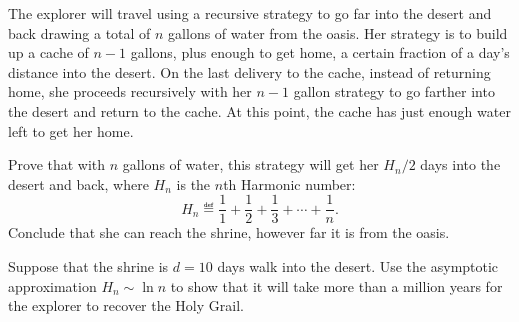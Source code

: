 \begin{problem}
\ppart The explorer will travel using a recursive strategy to go far into
the desert and back drawing a total of $n$ gallons of water from the
oasis.  Her strategy is to build up a cache of $n-1$ gallons, plus enough
to get home, a certain fraction of a day's distance into the desert.  On
the last delivery to the cache, instead of returning home, she proceeds
recursively with her $n-1$ gallon strategy to go farther into the desert
and return to the cache.  At this point, the cache has just enough water
left to get her home.

Prove that with $n$ gallons of water, this strategy will get her $H_n / 2$
days into the desert and back, where $H_n$ is the $n$th Harmonic number:
\[
H_n \eqdef \frac{1}{1} + \frac{1}{2} + \frac{1}{3} + \cdots + \frac{1}{n}.
\]
Conclude that she can reach the shrine, however far it is from the oasis.


\ppart Suppose that the shrine is $d = 10$ days walk into the desert.  Use
the asymptotic approximation $H_n \sim \ln n$ to show that it will take
more than a million years for the explorer to recover the Holy Grail.


\eparts
\end{problem}



